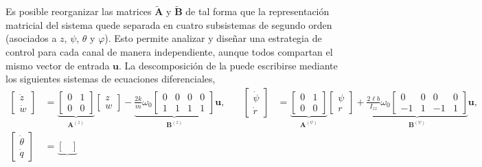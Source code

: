 Es posible reorganizar las matrices $\mathbf{\tilde{A}}$ y $\mathbf{\tilde{B}}$ de tal forma que la representación matricial del sistema quede separada en cuatro subsistemas de segundo orden (asociados a $z$, $\psi$, $\theta$ y $\varphi$). Esto permite analizar y diseñar una estrategia de control para cada canal de manera independiente, aunque todos compartan el mismo vector de entrada $\mathbf{u}$. La descomposición de la  puede escribirse mediante los siguientes sistemas de ecuaciones diferenciales, 
\begin{align}
    \begin{bmatrix}
        \dot{z} \\
        \dot{w}
    \end{bmatrix}
    &= 
    \underbrace{\begin{bmatrix}
        0 & 1 \\
        0 & 0 
    \end{bmatrix}}_{\mathbf{A}^{(z)}}
        \begin{bmatrix}
        z \\
        w
    \end{bmatrix}
    -\underbrace{ \frac{2k}{m}\omega_{0}
    \begin{bmatrix}
        0 & 0 & 0 & 0 \\
        1 & 1 & 1 & 1
    \end{bmatrix}}_{\mathbf{B}^{(z)}}
    \mathbf{u}, \quad 
&\begin{bmatrix} 
    \dot{\psi} \\
    \dot{r}
\end{bmatrix} 
&= 
\underbrace{\begin{bmatrix}
    0 & 1 \\
    0 & 0 
\end{bmatrix}}_{\mathbf{A}^{(\psi)}}
\begin{bmatrix}
    \psi \\
    r
\end{bmatrix}
+ \underbrace{\frac{2\ell b}{I_{zz}}\omega_0
\begin{bmatrix}
    0 & 0 & 0 & 0 \\
    -1& 1 & -1& 1
\end{bmatrix}}_{\mathbf{B}^{(\psi)}}
\mathbf{u}, \\
\begin{bmatrix}
    \dot{\theta} \\
    \dot{q}
\end{bmatrix}&= 
\underbrace{\begin{bmatrix}

\end{bmatrix}}
\end{align}
